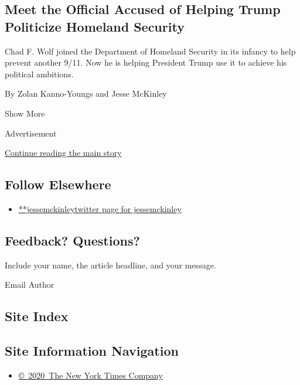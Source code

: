 \begin{enumerate}
{  \subsection{Meet the Official Accused of Helping Trump Politicize
  Homeland
  Security}\label{meet-the-official-accused-of-helping-trump-politicize-homeland-security}}

  Chad F. Wolf joined the Department of Homeland Security in its infancy
  to help prevent another 9/11. Now he is helping President Trump use it
  to achieve his political ambitions.

  By Zolan Kanno-Youngs and Jesse McKinley
\end{enumerate}

Show More

Advertisement

\protect\hyperlink{after-mid2}{Continue reading the main story}

\hypertarget{follow-elsewhere}{%
\subsection{Follow Elsewhere}\label{follow-elsewhere}}

\begin{itemize}
\tightlist
\item
  \href{https://twitter.com/jessemckinley}{**jessemckinleytwitter page
  for jessemckinley}
\end{itemize}

\hypertarget{feedback-questions}{%
\subsection{Feedback? Questions?}\label{feedback-questions}}

Include your name, the article headline, and your message.

Email Author

\hypertarget{site-index}{%
\subsection{Site Index}\label{site-index}}

\hypertarget{site-information-navigation}{%
\subsection{Site Information
Navigation}\label{site-information-navigation}}

\begin{itemize}
\tightlist
\item
  \href{https://help.nytimes3xbfgragh.onion/hc/en-us/articles/115014792127-Copyright-notice}{©~2020~The
  New York Times Company}
\end{itemize}

